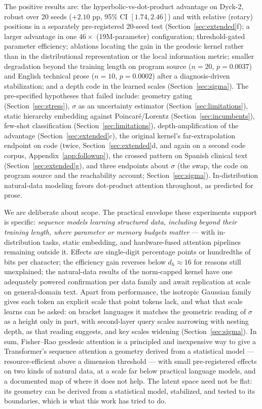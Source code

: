 \documentclass[11pt]{article}
\begin{document}
The positive results are: the hyperbolic-vs-dot-product advantage on Dyck-2, robust over 20 seeds ($+2.10$ pp, 95\% CI $[1.74, 2.46]$) and with relative (rotary) positions in a separately pre-registered 20-seed test (Section~\ref{sec:extended}f); a larger advantage in one $46\times$ (19M-parameter) configuration; threshold-gated parameter efficiency; ablations locating the gain in the geodesic kernel rather than in the distributional representation or the local information metric; smaller degradation beyond the training length on program source ($n{=}20$, $p = 0.0037$) and English technical prose ($n{=}10$, $p = 0.0002$) after a diagnosis-driven stabilization; and a depth code in the learned scales (Section~\ref{sec:sigma}). The pre-specified hypotheses that failed include: geometry gating (Section~\ref{sec:stress}), $\sigma$ as an uncertainty estimator (Section~\ref{sec:limitations}), static hierarchy embedding against Poincar\'e/Lorentz (Section~\ref{sec:incumbents}), few-shot classification (Section~\ref{sec:limitations}), depth-amplification of the advantage (Section~\ref{sec:extended}c), the original kernel's far-extrapolation endpoint on code (twice, Section~\ref{sec:extended}d, and again on a second code corpus, Appendix~\ref{app:followup}), the crossed pattern on Spanish clinical text (Section~\ref{sec:extended}g), and three endpoints about $\sigma$ (the swap, the code on program source and the reachability account; Section~\ref{sec:sigma}). In-distribution natural-data modeling favors dot-product attention throughout, as predicted for prose.

We are deliberate about scope. The practical envelope these experiments support is specific: \emph{sequence models learning structured data, including beyond their training length, where parameter or memory budgets matter} --- with in-distribution tasks, static embedding, and hardware-fused attention pipelines remaining outside it. Effects are single-digit percentage points or hundredths of bits per character; the efficiency gain reverses below $d_h \approx 16$ for reasons still unexplained; the natural-data results of the norm-capped kernel have one adequately powered confirmation per data family and await replication at scale on general-domain text. Apart from performance, the isotropic Gaussian family gives each token an explicit scale that point tokens lack, and what that scale learns can be asked: on bracket languages it matches the geometric reading of $\sigma$ as a height only in part, with second-layer query scales narrowing with nesting depth, as that reading suggests, and key scales widening (Section~\ref{sec:sigma}). In sum, Fisher--Rao geodesic attention is a principled and inexpensive way to give a Transformer's sequence attention a geometry derived from a statistical model --- resource-efficient above a dimension threshold --- with small pre-registered effects on two kinds of natural data, at a scale far below practical language models, and a documented map of where it does not help. The latent space need not be flat: its geometry can be derived from a statistical model, stabilized, and tested to its boundaries, which is what this work has tried to do.
\end{document}
